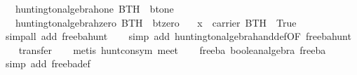 \begin{isabellebody}
\ \ \ {}huntington{}algebra{}hone\ BTH\ {}\ bt{}one{}\isanewline
\ \ \ {}huntington{}algebra{}hzero\ BTH\ {}\ bt{}zero{}\isanewline
\ \ \ {}x\ {}\ carrier\ BTH\ {}\ True{}\isanewline
%
\isadelimproof
\ \ %
\endisadelimproof
%
\isatagproof
{}\isamarkupfalse%
\ {}simp{}all\ add{}\ free{}ba{}hunt{}\isanewline
\ \ \isamarkupfalse%
\ {}simp\ add{}\ huntington{}algebra{}hand{}def{}OF\ free{}ba{}hunt{}{}\isanewline
\ \ \isamarkupfalse%
\ transfer\isanewline
\ \ \isamarkupfalse%
\ {}metis\ hunt{}con{}sym\ meet{}\isanewline
\ \ \isamarkupfalse%
%
\endisatagproof
{\isafoldproof}%
%
\isadelimproof
\isanewline
%
\endisadelimproof
\isanewline
{}\isamarkupfalse%
\ free{}ba{}\ {}boolean{}algebra\ free{}ba{}\isanewline
%
\isadelimproof
%
\endisadelimproof
%
\isatagproof
{}\isamarkupfalse%
\ {}simp\ add{}\ free{}ba{}def{}\isanewline

\end{isabellebody}
